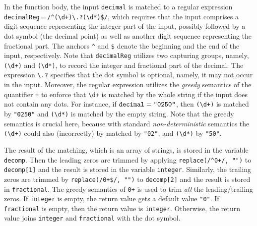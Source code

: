 In the function body, the input {\tt decimal} %
is matched to a regular expression {\tt decimalReg}\,=\,{\tt /\^{}({\footnotesize\textbackslash}d+){\footnotesize\textbackslash}.?({\footnotesize\textbackslash}d*)\$/}, which requires that  the input comprises a digit sequence representing the integer part of the input, possibly followed by a dot symbol (the decimal point) as well as another digit sequence representing the fractional part. The anchors  \verb!^! and \verb!$! denote the beginning and the end of the input, respectively. Note that  {\tt decimalReg} utilizes two capturing groups, namely, {\tt ({\footnotesize\textbackslash}d+)} and {\tt ({\footnotesize\textbackslash}d*)}, to record the integer and fractional part of the decimal. The expression {\tt {\footnotesize\textbackslash}.?} specifies that the dot symbol is optional, namely, it may not occur in the input. Moreover,  the regular expression utilizes the \emph{greedy} semantics of the quantifier {\tt +} to enforce that {\tt {\footnotesize\textbackslash}d+} is matched by the whole string if the input does not contain any dots. For instance, if ${\tt decimal} = \texttt{"0250"}$, then {\tt ({\footnotesize\textbackslash}d+)} is matched by \texttt{"0250"} and  {\tt ({\footnotesize\textbackslash}d*)} is matched by the empty string. 
Note that the greedy semantics is crucial here, because with standard \emph{non-deterministic} semantics the {\tt ({\footnotesize\textbackslash}d+)} could also (incorrectly) by matched by \texttt{"02"}, and {\tt ({\footnotesize\textbackslash}d*)} by \texttt{"50"}.

  The result of the matching, which is an array of strings, is stored in the variable {\tt decomp}. 
%
Then the leading zeros are trimmed by applying {\tt replace(/\^{}0+/, "")} to {\tt decomp[1]} and the result is stored in the variable {\tt integer}. Similarly, the trailing zeros are trimmed by {\tt replace(/{}0+\$/, "")} to {\tt decomp[2]} and the result is stored in {\tt fractional}. The greedy semantics of {\tt 0+} is used to trim \emph{all} the leading/trailing zeros.
%
If {\tt integer} is empty, the return value gets a default value \texttt{"0"}. If {\tt fractional} is empty, then the return value is {\tt integer}. Otherwise, the return value joins {\tt integer} and {\tt fractional} with the dot symbol. 

